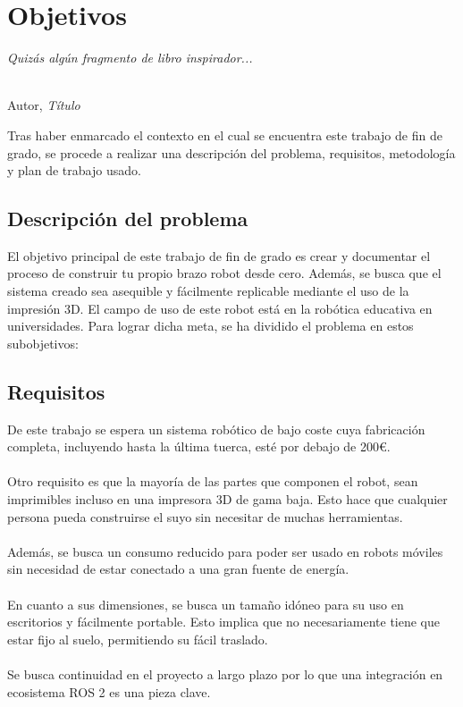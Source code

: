 \chapter{Objetivos}
\label{cap:capitulo2}

\begin{flushright}
\begin{minipage}[]{10cm}
\emph{Quizás algún fragmento de libro inspirador...}\\
\end{minipage}\\

Autor, \textit{Título}\\
\end{flushright}

\vspace{1cm}

Tras haber enmarcado el contexto en el cual se encuentra este trabajo de fin de grado, se procede a realizar
una descripción del problema, requisitos, metodología y plan de trabajo usado.
\section{Descripción del problema}
\label{sec:descripcion}
El objetivo principal de este trabajo de fin de grado es crear y documentar el proceso de construir tu propio brazo robot 
desde cero. Además, se busca que el sistema creado sea asequible y fácilmente replicable mediante el uso de la impresión 3D. El campo 
de uso de este robot está en la robótica educativa en universidades.
Para lograr dicha meta, se ha dividido el problema en estos
subobjetivos:
\section{Requisitos}
\label{sec:requisitos}
De este trabajo se espera un sistema robótico de bajo coste cuya fabricación completa, incluyendo hasta la última tuerca, esté 
por debajo de 200€.\\\\
Otro requisito es que la mayoría de las partes que componen el robot, sean imprimibles incluso en una impresora 3D de gama baja. Esto 
hace que cualquier persona pueda construirse el suyo sin necesitar de muchas herramientas.\\\\
Además, se busca un consumo reducido para poder ser usado en robots móviles sin necesidad de estar conectado a una gran fuente de 
energía.\\\\
En cuanto a sus dimensiones, se busca un tamaño idóneo para su uso en escritorios y fácilmente portable. Esto implica que no necesariamente 
tiene que estar fijo al suelo, permitiendo su fácil traslado.\\\\
Se busca continuidad en el proyecto a largo plazo por lo que una integración en ecosistema ROS 2 es una pieza clave. 

